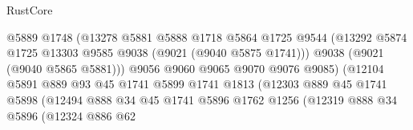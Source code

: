 \begin{lexlean}{RustCore}
\begin{coremodule}
                                        @5889
                                        @1748
                                        (@13278
                                          @5881
                                          @5888
                                          @1718
                                          @5864
                                          @1725
                                          @9544
                                          (@13292
                                            @5874
                                            @1725
                                            @13303
                                            @9585
                                            @9038
                                            (@9021 (@9040 @5875 @1741)))
                                          @9038
                                          (@9021 (@9040 @5865 @5881)))
                                        @9056
                                        @9060
                                        @9065
                                        @9070
                                        @9076
                                        @9085)
                                      (@12104
                                        @5891
                                        @889
                                        @93
                                        @45
                                        @1741
                                        @5899
                                        @1741
                                        @1813
                                        (@12303
                                          @889
                                          @45
                                          @1741
                                          @5898
                                          (@12494
                                            @888
                                            @34
                                            @45
                                            @1741
                                            @5896
                                            @1762
                                            @1256
                                            (@12319
                                              @888
                                              @34
                                              @5896
                                              (@12324
                                                @886
                                                @62

\end{coremodule}
\end{lexlean}
